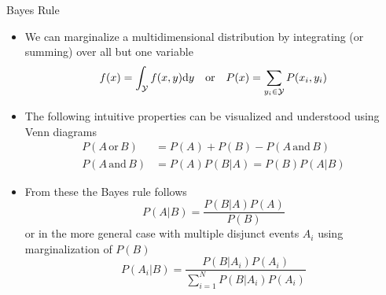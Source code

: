   \begin{frame}{Bayes Rule}
    \begin{itemize}
      \item We can marginalize a multidimensional distribution by integrating (or summing) over all but one variable
        \begin{equation*}
          f(x) = \int_\mathcal{Y}f(x,y)\mathrm{d}y
          \quad\mathrm{or}\quad
          P(x) = \sum_{y_i\in\mathcal{Y}} P(x_i, y_i)
        \end{equation*}
        \item The following intuitive properties can be visualized and understood using Venn diagrams
          \begin{align*}
            P(A\,\mathrm{or}\,B) &= P(A) + P(B) - P(A\,\mathrm{and}\,B) \\
            P(A\,\mathrm{and}\,B) &= P(A) P(B|A) = P(B) P(A|B)
          \end{align*}
        \item From these the Bayes rule follows
          \begin{equation*}
            P(A|B) = \frac{P(B|A) P(A)}{P(B)}
          \end{equation*}
          or in the more general case with multiple disjunct events $A_i$ using marginalization of $P(B)$
          \begin{equation*}
            P(A_i|B) = \frac{P(B|A_i) P(A_i)}{\sum_{i=1}^N P(B|A_i)P(A_i)}
          \end{equation*}
    \end{itemize}
  \end{frame}

